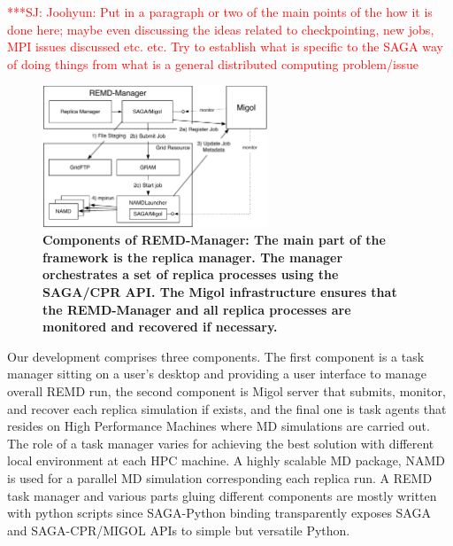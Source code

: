 \documentclass[times, 10pt, twocolumn]{article}
\newcommand{\jhanote}[1]{ {\textcolor{red} { ***SJ: #1 }}}
\newcommand{\jhanote}[1]{}
\begin{document}
\jhanote{Joohyun: Put in a paragraph or two of the main points of the
  how it is done here; maybe even discussing the ideas related to
  checkpointing, new jobs, MPI issues discussed etc. etc. Try to
  establish what is specific to the SAGA way of doing things from what
  is a general distributed computing problem/issue}

\begin{figure}[htbp]
      \centering
          \includegraphics[width=0.6\textwidth]{REMDgManager-architecture.pdf}
          \caption{\small \bf Components of REMD-Manager: The main part of the
            framework is the replica manager. The manager orchestrates
            a set of replica processes using the SAGA/CPR API. The
            Migol infrastructure ensures that the REMD-Manager and all
            replica processes are monitored and recovered if
            necessary.}
      \label{fig:REMD-Manager-architecture}
\end{figure}


Our development comprises three components. The first component is a
task manager sitting on a user's desktop and providing a user
interface to manage overall REMD run, the second component is Migol
server that submits, monitor, and recover each replica simulation if
exists, and the final one is task agents that resides on High
Performance Machines where MD simulations are carried out.  The role
of a task manager varies for achieving the best solution with
different local environment at each HPC machine.  A highly scalable MD
package, NAMD~\cite{Phillips:2005gd} is used for a parallel MD
simulation corresponding each replica run.  A REMD task manager and
various parts gluing different components are mostly written with
python scripts since SAGA-Python binding transparently exposes SAGA
and SAGA-CPR/MIGOL APIs to simple but versatile Python.
\end{document}

